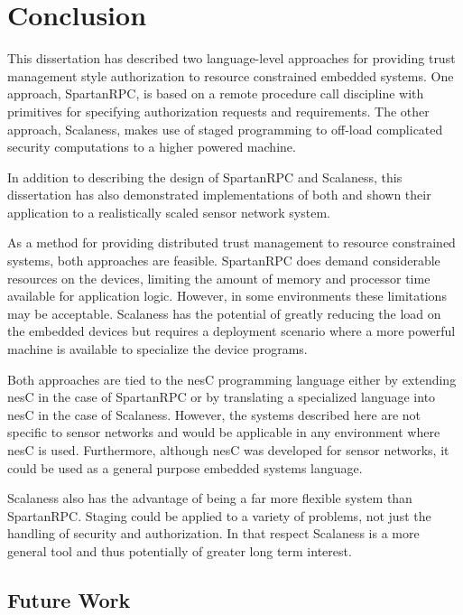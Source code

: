 
\chapter{Conclusion}
\label{chapter-conclusion}


This dissertation has described two language-level approaches for providing trust management
style authorization to resource constrained embedded systems. One approach, SpartanRPC, is based
on a remote procedure call discipline with primitives for specifying authorization requests and
requirements. The other approach, Scalaness, makes use of staged programming to off-load
complicated security computations to a higher powered machine.

In addition to describing the design of SpartanRPC and Scalaness, this dissertation has also
demonstrated implementations of both and shown their application to a realistically scaled
sensor network system.

As a method for providing distributed trust management to resource constrained systems, both
approaches are feasible. SpartanRPC does demand considerable resources on the devices, limiting
the amount of memory and processor time available for application logic. However, in some
environments these limitations may be acceptable. Scalaness has the potential of greatly
reducing the load on the embedded devices but requires a deployment scenario where a more
powerful machine is available to specialize the device programs.

Both approaches are tied to the nesC programming language either by extending nesC in the case
of SpartanRPC or by translating a specialized language into nesC in the case of Scalaness.
However, the systems described here are not specific to sensor networks and would be applicable
in any environment where nesC is used. Furthermore, although nesC was developed for sensor
networks, it could be used as a general purpose embedded systems language.

Scalaness also has the advantage of being a far more flexible system than SpartanRPC. Staging
could be applied to a variety of problems, not just the handling of security and authorization.
In that respect Scalaness is a more general tool and thus potentially of greater long term
interest.

\section{Future Work}
\label{section-future-work}

